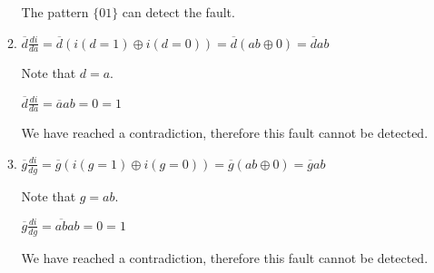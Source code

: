 \documentclass[a4paper,12pt]{article}
\begin{document}
\begin{enumerate}
\begin{enumerate}
                    The pattern $\{01\}$ can detect the fault.

                \item $\overline{d}\frac{di}{da} = \overline{d}(i(d = 1) \oplus i(d = 0)) = \overline{d}(ab \oplus 0) = \overline{d}ab$

                    Note that $d = a$.

                    $\overline{d}\frac{di}{da} = \overline{a}ab = 0 = 1$

                    We have reached a contradiction, therefore this fault cannot be detected.

                \item $\overline{g}\frac{di}{dg} = \overline{g}(i(g = 1) \oplus i(g = 0)) = \overline{g}(ab \oplus 0) = \overline{g}ab$

                    Note that $g = ab$.

                    $\overline{g}\frac{di}{dg} = \overline{ab}ab = 0 = 1$

                    We have reached a contradiction, therefore this fault cannot be detected.
            \end{enumerate}

    \end{enumerate}
\end{document}
